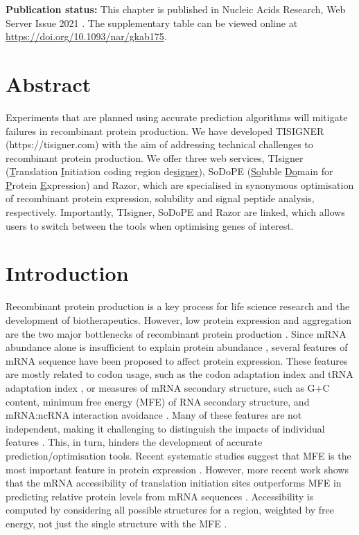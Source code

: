 \textbf{Publication status:} This chapter is published in Nucleic Acids Research, Web Server Issue 2021 \cite{Bhandari2020-pz}. The supplementary table can be viewed online at \href{https://doi.org/10.1093/nar/gkab175}{https://doi.org/10.1093/nar/gkab175}.

\section{Abstract}
Experiments that are planned using accurate prediction algorithms will
mitigate failures in recombinant protein production. We have developed
TISIGNER (https://tisigner.com) with the aim of addressing technical
challenges to recombinant protein production. We offer three web
services, TIsigner (\underline{T}ranslation \underline{I}nitiation
coding region de\underline{signer}), SoDoPE (\underline{So}luble
\underline{Do}main for \underline{P}rotein \underline{E}xpression) and
Razor, which are specialised in synonymous optimisation of recombinant
protein expression, solubility and signal peptide analysis,
respectively. Importantly, TIsigner, SoDoPE and Razor are linked, which
allows users to switch between the tools when optimising genes of
interest.


\section{Introduction}

Recombinant protein production is a key process for life science
research and the development of biotherapeutics. However, low protein
expression and aggregation are the two major bottlenecks of recombinant
protein production \cite{Berlec2013-mb,Esposito2006-tj,Hou2018-yd,Kramer2012-wk,Mazurenko2020-pr,Rosano2014-oq,Vihinen2020-ar}.
Since mRNA abundance alone is insufficient to explain protein abundance \cite{Bernstein2002-gg,Abreu2009-zf,Lim2018-rq,Nieuwkoop2020-ph,Taniguchi2010-uq},
several features of mRNA sequence have been proposed to affect protein expression. 
These features are mostly related to codon usage, such as
the codon adaptation index and tRNA adaptation index
\cite{Brule2017-mx,Reis2004-dl,Gutman1989-pn,Sabi2014-je,Sharp1987-ed},
or measures of mRNA secondary structure, such as G+C content, minimum
free energy (MFE) of RNA secondary structure, and mRNA:ncRNA interaction
avoidance
\cite{De_Smit1990-xy,Dvir2013-lq,Kudla2009-tl,Plotkin2011-ak,Tuller2015-ts,Umu2016-zq}.
Many of these features are not independent, making it challenging to
distinguish the impacts of individual features
\cite{mauger2019mrna}. This, in turn, hinders
the development of accurate prediction/optimisation tools. Recent systematic 
studies suggest that MFE is the most important feature in
protein expression \cite{Cambray2018-kn,mauger2019mrna}. However, more 
recent work shows that the mRNA accessibility of translation initiation sites 
outperforms MFE in predicting relative protein levels from mRNA sequences
\cite{bhandari2019highly,Terai2020-co}. Accessibility
is computed by considering all possible structures for a region,
weighted by free energy, not just the single structure with the MFE \cite{Bernhart2006-ma}.

